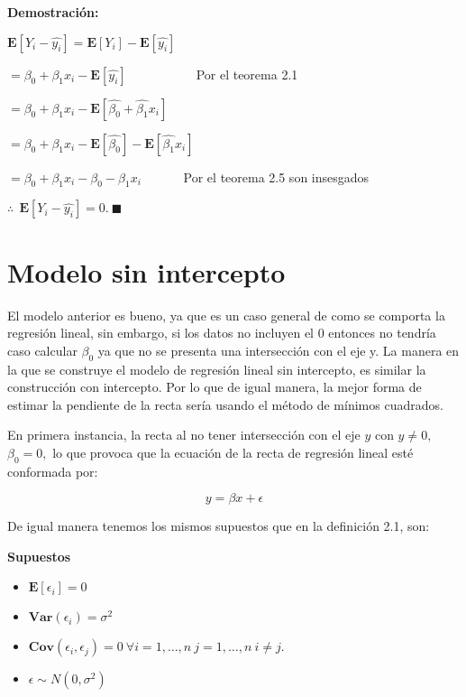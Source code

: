 \documentclass[
  a4paper,
  oneside,
  openany]{book}
\begin{document}
\textbf{Demostración:}

\(\mathbf{E}\left[ Y_{i}-\hat{y_{i}}\right]=\mathbf{E}\left[ Y_{i}\right]-\mathbf{E}\left[\hat{y_{i}}\right]\)

\(=\beta_{0}+\beta_{1}x_{i}-\mathbf{E}\left[\hat{y_{i}}\right]\) ~~~ ~~~ ~~~Por el teorema 2.1

\(=\beta_{0}+\beta_{1}x_{i}-\mathbf{E}\left[ \hat{\beta_{0}}+\hat{\beta_{1}}x_{i}\right]\)

\(=\beta_{0}+\beta_{1}x_{i}-\mathbf{E}\left[ \hat{\beta_{0}}\right]-\mathbf{E}\left[\hat{\beta_{1}}x_{i}\right]\)

\(=\beta_{0}+\beta_{1}x_{i}-\beta_{0}-\beta_{1}x_{i}\) ~~~~~~Por el teorema 2.5 son insesgados

\(\therefore \ \ \mathbf{E}\left[ Y_{i}-\hat{y_{i}}\right]=0.\  \blacksquare\)

\hypertarget{modelo-sin-intercepto}{%
\chapter{Modelo sin intercepto}\label{modelo-sin-intercepto}}

El modelo anterior es bueno, ya que es un caso general de como se comporta la regresión lineal, sin embargo, si los datos no incluyen el 0 entonces no tendría caso calcular \(\beta_{0}\) ya que no se presenta una intersección con el eje y.
La manera en la que se construye el modelo de regresión lineal sin intercepto, es similar la construcción con intercepto. Por lo que de igual manera, la mejor forma de estimar la pendiente de la recta sería usando el método de mínimos cuadrados.

En primera instancia, la recta al no tener intersección con el eje \(y\) con \(y \neq 0,\) \(\beta_{0}=0,\) lo que provoca que la ecuación de la recta de regresión lineal esté conformada por:

\[y=\beta x + \epsilon\]

De igual manera tenemos los mismos supuestos que en la definición 2.1, son:

\textbf{Supuestos}

\begin{itemize}
\item
  \(\mathbf{E}[\epsilon_{i}]=0\)
\item
  \(\textbf{Var}(\epsilon_{i})=\sigma^2\)
\item
  \(\textbf{Cov}(\epsilon_{i},\epsilon_{j})= 0 \ \forall i = 1, \ldots, n \ j=1, \ldots, n \ i \neq j.\)
\item
  \(\epsilon \sim N(0,\sigma^2)\)
\end{itemize}
\end{document}
